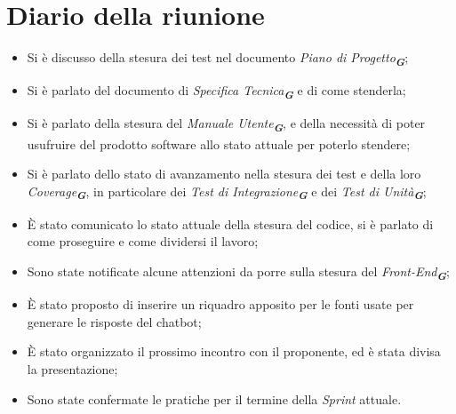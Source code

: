 
\section{Diario della riunione}

\begin{itemize}
    \item Si è discusso della stesura dei test nel documento \emph{Piano di Progetto}\textsubscript{\textit{\textbf{G}}};
    \item Si è parlato del documento di \emph{Specifica Tecnica}\textsubscript{\textit{\textbf{G}}} e di come stenderla;
    \item Si è parlato della stesura del \emph{Manuale Utente}\textsubscript{\textit{\textbf{G}}}, e della necessità di poter usufruire del prodotto software allo stato attuale per poterlo stendere;
    \item Si è parlato dello stato di avanzamento nella stesura dei test e della loro \emph{Coverage}\textsubscript{\textit{\textbf{G}}}, in particolare dei \emph{Test di Integrazione}\textsubscript{\textit{\textbf{G}}} e dei \emph{Test di Unità}\textsubscript{\textit{\textbf{G}}};
    \item È stato comunicato lo stato attuale della stesura del codice, si è parlato di come proseguire e come dividersi il lavoro;
    \item Sono state notificate alcune attenzioni da porre sulla stesura del \emph{Front-End}\textsubscript{\textit{\textbf{G}}};
    \item È stato proposto di inserire un riquadro apposito per le fonti usate per generare le risposte del chatbot;
    \item È stato organizzato il prossimo incontro con il proponente, ed è stata divisa la presentazione;
    \item Sono state confermate le pratiche per il termine della \emph{Sprint} attuale.
\end{itemize}



